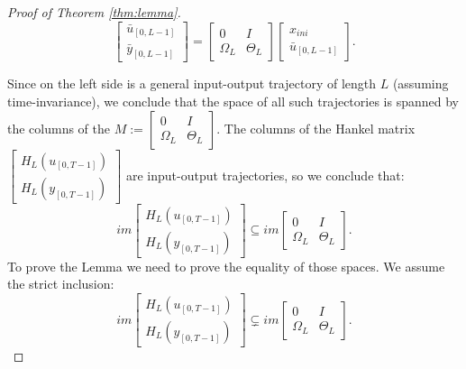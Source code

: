 \documentclass[12pt,a4paper]{report}
\begin{document}
\begin{proof}[Proof of Theorem \ref{thm:lemma}]
    \begin{equation}
        \begin{bmatrix} \bar{u}_{[0, L-1]} \\ \bar{y}_{[0, L-1]}\end{bmatrix} = \begin{bmatrix}0 & I \\ \Omega_L & \Theta_L \end{bmatrix} \begin{bmatrix}x_{ini} \\ \bar{u}_{[0, L-1]} \end{bmatrix}.
        \label{eq:io}
    \end{equation}

    Since on the left side is a general input-output trajectory of length $L$ (assuming time-invariance), we conclude that the space of all such trajectories is spanned by the columns of the
    \(M := \begin{bmatrix}0 & I \\ \Omega_L & \Theta_L \end{bmatrix} \).
    The columns of the Hankel matrix \(\begin{bmatrix} H_{L}(u_{[0, T-1]}) \\ H_{L}(y_{[0, T-1]}) \end{bmatrix}\) are input-output trajectories, so we conclude that:
    \[im\begin{bmatrix} H_{L}(u_{[0, T-1]})\\ H_{L}(y_{[0, T-1]})\end{bmatrix} \subseteq im\begin{bmatrix}0 & I \\ \Omega_L & \Theta_L \end{bmatrix}.\]
    To prove the Lemma we need to prove the equality of those spaces. We assume the strict inclusion:
    \[im\begin{bmatrix} H_{L}(u_{[0, T-1]})\\ H_{L}(y_{[0, T-1]})\end{bmatrix} \subsetneq im\begin{bmatrix}0 & I \\ \Omega_L & \Theta_L \end{bmatrix}.\]

\end{proof}
\end{document}
